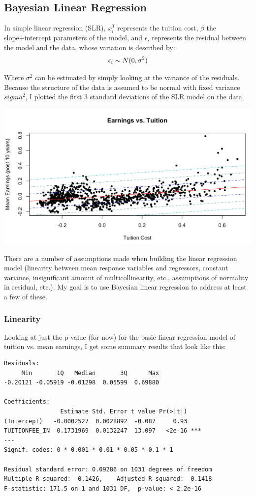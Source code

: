 \documentclass[10pt]{article}
\begin{document}
\subsection{Bayesian Linear Regression}
In simple linear regression (SLR), $x_{i}^T$ represents the tuition cost, $\beta$ the slope+intercept parameters of the model, and $\epsilon_i$ represents the residual between the model and the data, whose variation is described by:
$$\epsilon_i \thicksim N(0, \sigma^2) $$

Where $\sigma^2$ can be estimated by simply looking at the variance of the residuals. Because the structure of the data is assumed to be normal with fixed variance $sigma^2$, I plotted the first 3 standard deviations of the SLR model on the data. 

\includegraphics[width=\textwidth]{figures/SLR}

There are a number of assumptions made when building the linear regression model (linearity between mean response variables and regressors, constant variance, insignificant amount of multicollinearity, etc., assumptions of normality in residual, etc.). My goal is to use Bayesian linear regression to  address at least a few of these. 

\subsubsection{Linearity}
Looking at just the p-value (for now) for the basic linear regression model of tuition vs. mean earnings, I get some summary results that look like this: 

\begin{center}
\begin{lstlisting}
Residuals:
     Min       1Q   Median       3Q      Max 
-0.20121 -0.05919 -0.01298  0.05599  0.69880 

Coefficients:
                Estimate Std. Error t value Pr(>|t|)    
(Intercept)   -0.0002527  0.0028892  -0.087     0.93    
TUITIONFEE_IN  0.1731969  0.0132247  13.097   <2e-16 ***
---
Signif. codes: 0 * 0.001 * 0.01 * 0.05 * 0.1 * 1

Residual standard error: 0.09286 on 1031 degrees of freedom
Multiple R-squared:  0.1426,	Adjusted R-squared:  0.1418 
F-statistic: 171.5 on 1 and 1031 DF,  p-value: < 2.2e-16
\end{lstlisting}
\end{center}
\end{document}
